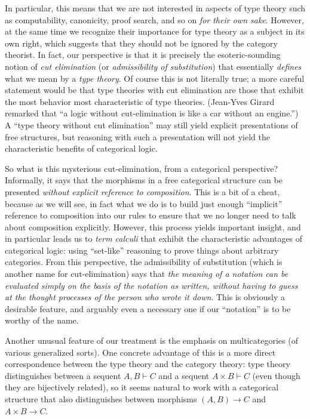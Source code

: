 \documentclass{book}
\let\types\vdash
\begin{document}
In particular, this means that we are not interested in aspects of type theory such as computability, canonicity, proof search, and so on \emph{for their own sake}.
However, at the same time we recognize their importance for type theory as a subject in its own right, which suggests that they should not be ignored by the category theorist.
In fact, our perspective is that it is precisely the esoteric-sounding notion of \emph{cut elimination} (or \emph{admissibility of substitution}) that essentially \emph{defines} what we mean by a \emph{type theory}.
Of course this is not literally true; a more careful statement would be that type theories with cut elimination are those that exhibit the most behavior most characteristic of type theories.
(Jean-Yves Girard remarked that ``a logic without cut-elimination is like a car without an engine.'')
A ``type theory without cut elimination'' may still yield explicit presentations of free structures, but reasoning with such a presentation will not yield the characteristic benefits of categorical logic.

So what is this mysterious cut-elimination, from a categorical perspective?
Informally, it says that the morphisms in a free categorical structure can be presented \emph{without explicit reference to composition}.
This is a bit of a cheat, because as we will see, in fact what we do is to build just enough ``implicit'' reference to composition into our rules to ensure that we no longer need to talk about composition explicitly.
However, this process yields important insight, and in particular leads us to \emph{term calculi} that exhibit the characteristic advantages of categorical logic: using ``set-like'' reasoning to prove things about arbitrary categories.
From this perspective, the admissibility of substitution (which is another name for cut-elimination) says that \emph{the meaning of a notation can be evaluated simply on the basis of the notation as written, without having to guess at the thought processes of the person who wrote it down}.
This is obviously a desirable feature, and arguably even a necessary one if our ``notation'' is to be worthy of the name.

Another unusual feature of our treatment is the emphasis on multicategories (of various generalized sorts).
One concrete advantage of this is a more direct correspondence between the type theory and the category theory: type theory distinguishes between a sequent $A,B\types C$ and a sequent $A\times B\types C$ (even though they are bijectively related), so it seems natural to work with a categorical structure that also distinguishes between morphisms $(A,B)\to C$ and $A\times B\to C$.
\end{document}

